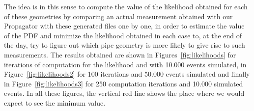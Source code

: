 \documentclass[a4paper, 11pt, twoside, openright]{report}
\begin{document}
The idea is in this sense to compute the value of the likelihood obtained for each of these geometries by comparing an actual measurement obtained with our Propagator with these generated files one by one, in order to estimate the value of the PDF and minimize the likelihood obtained in each case to, at the end of the day, try to figure out which pipe geometry is more likely to give rise to such measurements. The results obtained are shown in Figures~\ref{fig:likelihoods} for iterations of computation for the likelihood and with 10.000 events simulated, in Figure~\ref{fig:likelihoods2} for 100 iterations and 50.000 events simulated and finally in Figure~\ref{fig:likelihoods3} for 250 computation iterations and 10.000 simulated events. In all these figures, the vertical red line shows the place where we would expect to see the minimum value.
\end{document}
